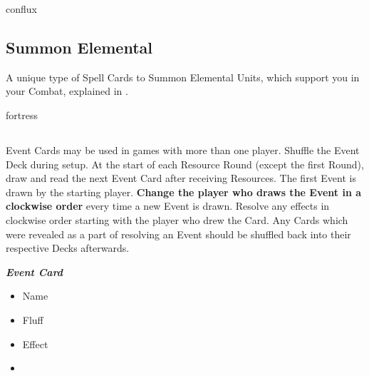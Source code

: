 \begin{multicols*}{2}
\vspace*{1em}
\begin{expansion}{conflux}
   \subsection*{Summon Elemental}
   A unique type of Spell Cards to Summon Elemental Units, which support you in your Combat, explained in .
\end{expansion}

\begin{expansion}{fortress}
  \subsection*{}
  Event Cards may be used in games with more than one player.
  Shuffle the Event Deck during setup.
  At the start of each Resource Round (except the first Round), draw and read the next Event Card after receiving Resources.
  The first Event is drawn by the starting player.
  \textbf{Change the player who draws the Event in a clockwise order} every time a new Event is drawn.
  Resolve any effects in clockwise order starting with the player who drew the Card.
  Any Cards which were revealed as a part of resolving an Event should be shuffled back into their respective Decks afterwards.

  \medskip

  \begin{minipage}[h]{\linewidth}
    \vspace{0.1pt}
    \centering
    \begin{scriptsize}
    \end{scriptsize}
    \footnotesize
    \textbf{\textit{\textcolor{darkcandyapplered}{Event Card}}}
    \begin{multicols}{2}
      \begin{itemize}
        \item[\textbf{1.}] Name
        \item[\textbf{2.}] Fluff
        \item[\textbf{3.}] Effect
        \item[\textbf{\phantom{.}}] \phantom{.}
      \end{itemize}
    \end{multicols}
  \end{minipage}
\end{expansion}


\end{multicols*}
